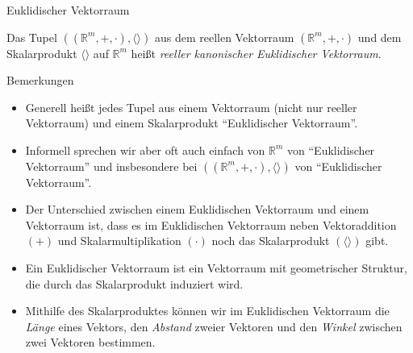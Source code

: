 \documentclass[
  8pt,
  ignorenonframetext,
]{beamer}
\providecommand{\tightlist}{%
  \setlength{\itemsep}{0pt}\setlength{\parskip}{0pt}}
\begin{document}
\begin{frame}{Euklidischer Vektorraum}
\protect\hypertarget{euklidischer-vektorraum-2}{}
\vspace{3mm}
\justify
{}

\begin{definition}
Das Tupel $((\mathbb{R}^m,+,\cdot),\langle\rangle)$ aus dem reellen Vektorraum $(\mathbb{R}^m,+,\cdot)$ und dem Skalarprodukt $\langle \rangle$ auf $\mathbb{R}^m$ heißt \textit{reeller kanonischer Euklidischer Vektorraum}.
\end{definition}

\small

Bemerkungen

\begin{itemize}
\tightlist
\item
  Generell heißt jedes Tupel aus einem Vektorraum (nicht nur reeller
  Vektorraum) und einem Skalarprodukt ``Euklidischer Vektorraum''.
\item
  Informell sprechen wir aber oft auch einfach von \(\mathbb{R}^m\) von
  ``Euklidischer Vektorraum'' und insbesondere bei
  \(((\mathbb{R}^m,+,\cdot),\langle\rangle)\) von ``Euklidischer
  Vektorraum''.
\item
  Der Unterschied zwischen einem Euklidischen Vektorraum und einem
  Vektorraum ist, dass es im Euklidischen Vektorraum neben
  Vektoraddition \((+)\) und Skalarmultiplikation \((\cdot)\) noch das
  Skalarprodukt \((\langle \rangle)\) gibt.
\item
  Ein Euklidischer Vektorraum ist ein Vektorraum mit geometrischer
  Struktur, die durch das Skalarprodukt induziert wird.
\item
  Mithilfe des Skalarproduktes können wir im Euklidischen Vektorraum die
  \emph{Länge} eines Vektors, den \emph{Abstand} zweier Vektoren und den
  \emph{Winkel} zwischen zwei Vektoren bestimmen.
\end{itemize}
\end{frame}
\end{document}
